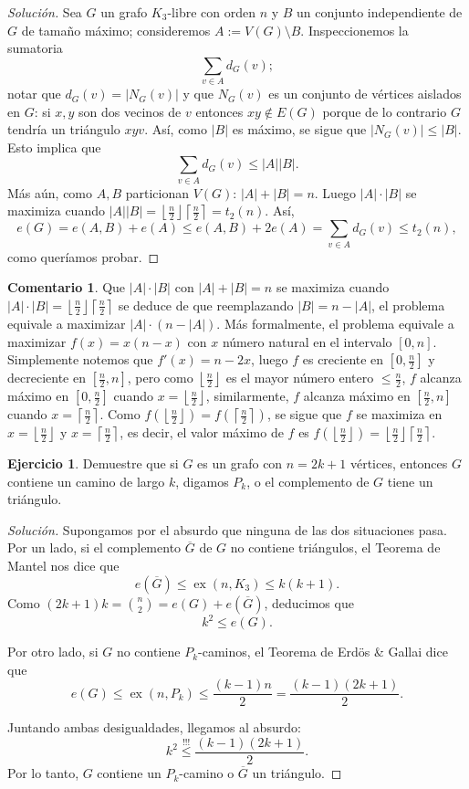\documentclass[12pt]{report}
\theoremstyle{plain}
\theoremstyle{definition}
\newtheorem{remark}[theorem]{Comentario}
\newtheorem{exercise}[theorem]{Ejercicio}
\newenvironment{solution}{\begin{proof}[Solución]}{\end{proof}}
\newcommand{\abs}[1]{\left \vert #1 \right \vert}
\renewcommand{\bar}[1]{\overline{#1}}
\newcommand{\ceil}[1]{\left\lceil #1  \right\rceil}
\newcommand{\floor}[1]{\left\lfloor #1  \right\rfloor}
\newcommand{\ex}[2]{\operatorname{ex} (#1, #2)}
\begin{document}
\begin{solution}
Sea $G$ un grafo $K_3$-libre con orden $n$ y $B$ un conjunto independiente de $G$ de tamaño máximo; consideremos $A := V(G) \setminus B$. Inspeccionemos la sumatoria
\[
    \sum_{v \in A} d_G (v);
\]
notar que $d_G (v) = \abs{N_G (v)}$ y que $N_G (v)$ es un conjunto de vértices aislados en $G$: si $x,y$ son dos vecinos de $v$ entonces $xy \not \in E(G)$ porque de lo contrario $G$ tendría un triángulo $xyv$. Así, como $\abs B$ es máximo, se sigue que $\abs{N_G (v)} \leq \abs B$. Esto implica que
\[
    \sum_{v \in A} d_G (v) \leq \abs A \abs B   .
\]
Más aún, como $A,B$ particionan $V(G)$: $\abs A + \abs B = n$. Luego $\abs{A} \cdot \abs B$ se maximiza cuando $\abs A \abs B = \floor{\frac n 2} \ceil{\frac n 2} = t_2 (n)$. Así,
\[
    e(G) = e(A,B) + e(A) \leq e(A,B) + 2 e(A) = \sum_{v \in A} d_G (v) \leq t_2 (n),
\]
como queríamos probar.
\end{solution}

\begin{remark}
Que $\abs A \cdot \abs B$ con $\abs A + \abs B = n$ se maximiza cuando $\abs A \cdot \abs B = \floor {\frac n 2} \ceil {\frac n 2}$ se deduce de que reemplazando $\abs B = n - \abs A$, el problema equivale a maximizar $\abs A \cdot (n - \abs A)$. Más formalmente, el problema equivale a maximizar $f (x) = x (n - x)$ con $x$ número natural en el intervalo $[0, n]$. Simplemente notemos que $f'(x) = n - 2 x$, luego $f$ es creciente en $[0, \frac n 2]$ y decreciente en $[ \frac n 2 , n]$, pero como $\floor{\frac n 2}$ es el mayor número entero $\leq \frac n 2$, $f$ alcanza máximo en $[0, \frac n 2]$ cuando $x = \floor {\frac n 2}$, similarmente, $f$ alcanza máximo en $[\frac n 2, n]$ cuando $x = \ceil{\frac n 2}$. Como $f(\floor{\frac n 2}) = f (\ceil {\frac n 2})$, se sigue que $f$ se maximiza en $x = \floor {\frac n 2}$ y $x = \ceil {\frac n 2}$, es decir, el valor máximo de $f$ es $f (\floor{\frac n 2}) = \floor{\frac n 2} \ceil{\frac n 2}$.
\end{remark}


\begin{exercise}
Demuestre que si $G$ es un grafo con $n = 2k+1$ vértices, entonces $G$ contiene un camino de largo $k$, digamos $P_k$, o el complemento de $G$ tiene un triángulo.
\end{exercise}
\begin{solution}
Supongamos por el absurdo que ninguna de las dos situaciones pasa. Por un lado, si el complemento $\bar G$ de $G$ no contiene triángulos, el Teorema de Mantel nos dice que
\[
    e(\bar G) \leq \ex n {K_3} \leq k (k+1).
\]
Como $(2k + 1) k = \binom n 2 = e(G) + e(\bar G)$, deducimos que
\[
    k^2 \leq e(G).
\]

Por otro lado, si $G$ no contiene $P_k$-caminos, el Teorema de Erdös \& Gallai dice que
\[
    e(G) \leq \ex n {P_k} \leq \frac{(k-1)n}{2} = \frac{(k-1)(2k+1)}{2}.
\]

Juntando ambas desigualdades, llegamos al absurdo:
\[
    k^2 \overset{!!!}{\leq} \frac{(k-1)(2k+1)}{2}.
\]
Por lo tanto, $G$ contiene un $P_k$-camino o $\bar G$ un triángulo.
\end{solution}
\end{document}
